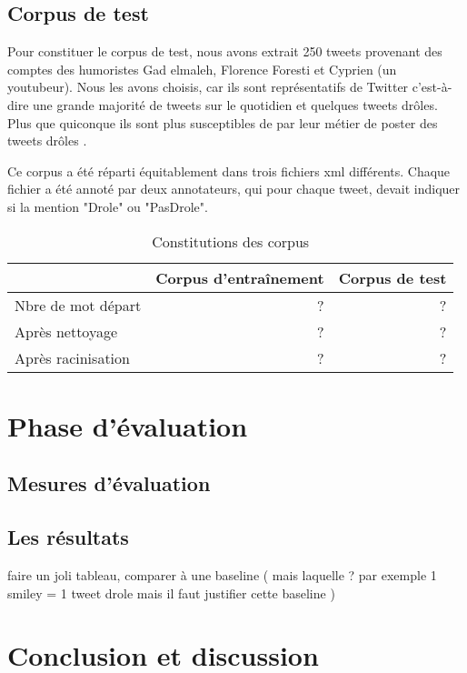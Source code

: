 \documentclass[10pt,a4paper,twoside]{article}
\begin{document}
\subsection{Corpus de test} 
Pour constituer le corpus de test, nous avons extrait 250 tweets provenant des comptes des humoristes Gad elmaleh, Florence Foresti et Cyprien (un youtubeur). Nous les avons choisis, car ils sont représentatifs de Twitter c'est-à-dire une grande majorité de tweets sur le quotidien et quelques tweets drôles. Plus que quiconque ils sont plus susceptibles de par leur métier de poster des tweets drôles .

Ce corpus a été réparti équitablement dans trois fichiers xml différents. Chaque fichier a été annoté par deux annotateurs, qui pour chaque tweet, devait indiquer si la mention "Drole" ou "PasDrole".



\begin{table}[!h]
\centering
	\begin{tabular}{lrr}
	\toprule
	& Corpus d'entraînement & Corpus de test \\
	\midrule
	 Nbre de mot départ & ? & ? \\
	 Après nettoyage & ? & ? \\
	 Après racinisation & ? & ? \\
	\bottomrule
	\end{tabular}
\caption{Constitutions des corpus}
\end{table}


\section{Phase d'évaluation}

\subsection{Mesures d'évaluation}

\subsection{Les résultats}
faire un joli tableau, comparer à une baseline ( mais laquelle ? par exemple  1 smiley = 1 tweet drole mais il faut justifier cette baseline ) 

\section{Conclusion et discussion}
\end{document}
